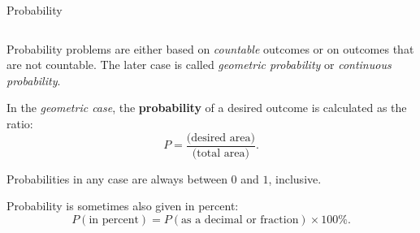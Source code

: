 \documentclass[9pt,aspectratio=169]{beamer}
\begin{document}
\begin{frame}{Probability}
\begin{columns}[T]
\begin{column}{0.5\textwidth}
      Probability problems are either based on \emph{countable} outcomes or on outcomes that are not countable. The later case is called \emph{geometric probability} or \emph{continuous probability}.

      \begin{definition}
        In the \emph{geometric case}, the \textbf{probability} of a desired outcome is calculated as the ratio:
        \[ P = \frac{\text{(desired area)}}{\text{(total area)}}. \]
        \vspace*{-1.5ex}
      \end{definition}

      Probabilities in any case are always between $0$ and $1$, inclusive.

      Probability is sometimes also given in percent:
      \[ 𝑃(\text{in percent}) = 𝑃(\text{as a decimal or fraction}) \times 100\%. \]

    \end{column}
  \end{columns}
\end{frame}
\end{document}
